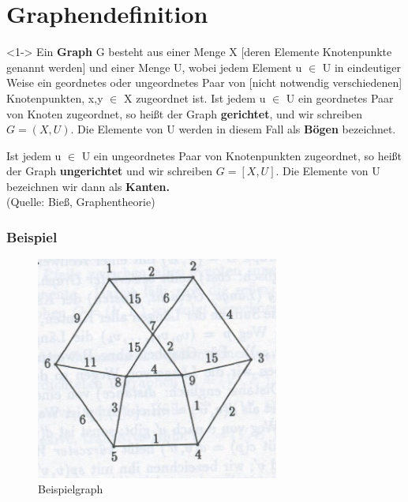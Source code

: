 \section{Graphendefinition}

\begin{frame}
	\begin{block}<1->{}
				Ein \textbf{Graph} G besteht aus einer Menge X [deren Elemente Knotenpunkte genannt werden] und einer Menge U, wobei jedem Element u $\in$ U in eindeutiger Weise ein geordnetes oder ungeordnetes Paar von [nicht notwendig verschiedenen] Knotenpunkten, x,y $\in$ X zugeordnet ist.
				Ist jedem u $\in$ U ein geordnetes Paar von Knoten zugeordnet, so heißt der Graph \textbf{gerichtet}, und wir schreiben 
				$G= (X, U)$.
				Die Elemente von U werden in diesem Fall als \textbf{Bögen} bezeichnet.

				Ist jedem u $\in$ U ein ungeordnetes Paar von Knotenpunkten zugeordnet, so heißt der Graph \textbf{ungerichtet} und wir schreiben 
				$G=[X,U]$. 
				Die Elemente von U bezeichnen wir dann als \textbf{Kanten.} \\
				\tiny (Quelle: Bieß, Graphentheorie)
	\end{block}
\end{frame}

\begin{frame}
\frametitle{Beispiel}
	\begin{figure}[h]
\centering
\includegraphics[width = 8cm]{./pictures/Graph.jpg}
\caption{Beispielgraph %
}
\label{a1}
\end{figure}
\end{frame}
	